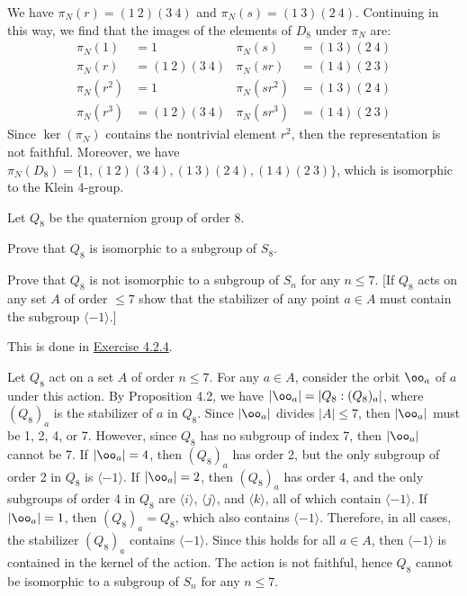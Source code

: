 \begin{sol}
	We have $\pi_N(r) = (1\ 2)(3\ 4)$ and $\pi_N(s) = (1\ 3)(2\ 4)$. Continuing in this way, we find that the images of the elements of $D_8$ under $\pi_N$ are:
	\begin{align*}
		\pi_N(1) & = 1 & \pi_N(s) & = (1\ 3)(2\ 4) \\
		\pi_N(r) & = (1\ 2)(3\ 4) & \pi_N(sr) & = (1\ 4)(2\ 3) \\
		\pi_N(r^2) & = 1 & \pi_N(sr^2) & = (1\ 3)(2\ 4) \\
		\pi_N(r^3) & = (1\ 2)(3\ 4) & \pi_N(sr^3) & = (1\ 4)(2\ 3)
	\end{align*}
	Since $\ker(\pi_N)$ contains the nontrivial element $r^2$, then the representation is not faithful. Moreover, we have $\pi_N(D_8) = \{1, (1\ 2)(3\ 4), (1\ 3)(2\ 4), (1\ 4)(2\ 3)\}$, which is isomorphic to the Klein 4-group.
\end{sol}

\begin{exercise}
	Let $Q_8$ be the quaternion group of order 8.
	\begin{subproblems}
		\item Prove that $Q_8$ is isomorphic to a subgroup of $S_8$.
		\item Prove that $Q_8$ is not isomorphic to a subgroup of $S_n$ for any $n \le 7$. [If $Q_8$ acts on any set $A$ of order $\le 7$ show that the stabilizer of any point $a \in A$ must contain the subgroup $\langle -1 \rangle$.]
	\end{subproblems}
\end{exercise}

\begin{solalph}
	\item This is done in \hyperref[ex4.2.4]{Exercise 4.2.4}.
	\item Let $Q_8$ act on a set $A$ of order $n \leq 7$. For any $a \in A$, consider the orbit $\oo_a$ of $a$ under this action. By Proposition 4.2, we have $|\oo_a| = |Q_8 : (Q_8)_a|$, where $(Q_8)_a$ is the stabilizer of $a$ in $Q_8$. Since $|\oo_a|$ divides $|A| \leq 7$, then $|\oo_a|$ must be 1, 2, 4, or 7. However, since $Q_8$ has no subgroup of index 7, then $|\oo_a|$ cannot be 7. If $|\oo_a| = 4$, then $(Q_8)_a$ has order 2, but the only subgroup of order 2 in $Q_8$ is $\langle -1 \rangle$. If $|\oo_a| = 2$, then $(Q_8)_a$ has order 4, and the only subgroups of order 4 in $Q_8$ are $\langle i \rangle$, $\langle j \rangle$, and $\langle k \rangle$, all of which contain $\langle -1 \rangle$. If $|\oo_a| = 1$, then $(Q_8)_a = Q_8$, which also contains $\langle -1 \rangle$. Therefore, in all cases, the stabilizer $(Q_8)_a$ contains $\langle -1 \rangle$. Since this holds for all $a \in A$, then $\langle -1 \rangle$ is contained in the kernel of the action. The action is not faithful, hence $Q_8$ cannot be isomorphic to a subgroup of $S_n$ for any $n \leq 7$.
\end{solalph}

